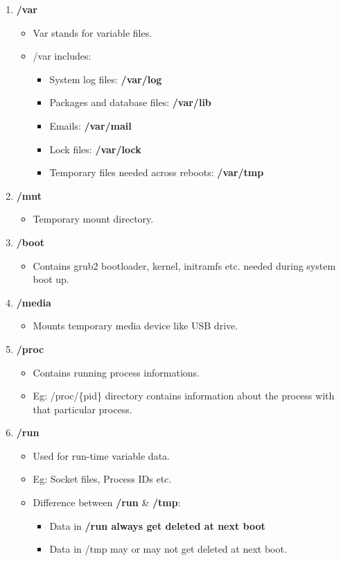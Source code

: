 \begin{flushleft}
\begin{enumerate}
\begin{itemize}
		\end{itemize}
		\item \textbf{/var}
		\begin{itemize}
			\item Var stands for variable files.
			\item /var includes:
			\begin{itemize}
				\item System log files: \textbf{/var/log}
				\item Packages and database files: \textbf{/var/lib}
				\item Emails: \textbf{/var/mail}
				\item Lock files: \textbf{/var/lock}
				\item Temporary files needed across reboots: \textbf{/var/tmp}
			\end{itemize}
		\end{itemize}
			\item \textbf{/mnt}
		\begin{itemize}
			\item Temporary mount directory.
		\end{itemize}
		\item \textbf{/boot}
		\begin{itemize}
			\item Contains grub2 bootloader, kernel, initramfs etc. needed during system boot up.
		\end{itemize}
		\item \textbf{/media}
		\begin{itemize}
			\item Mounts temporary media device like USB drive.
		\end{itemize}
	\newpage
		\item \textbf{/proc}
		\begin{itemize}
			\item Contains running process informations.
			\item Eg: /proc/\{pid\} directory contains information about the process with that particular process.
		\end{itemize}
		\item \textbf{/run}
		\begin{itemize}
			\item Used for run-time variable data.
			\item Eg: Socket files, Process IDs etc.
			\item Difference between \textbf{/run} \& \textbf{/tmp}:
			\begin{itemize}
				\item Data in \textbf{/run always get deleted at next boot}
				\item Data in /tmp may or may not get deleted at next boot.
			\end{itemize}
		\end{itemize}
	\end{enumerate}
	
\end{flushleft}

\newpage
